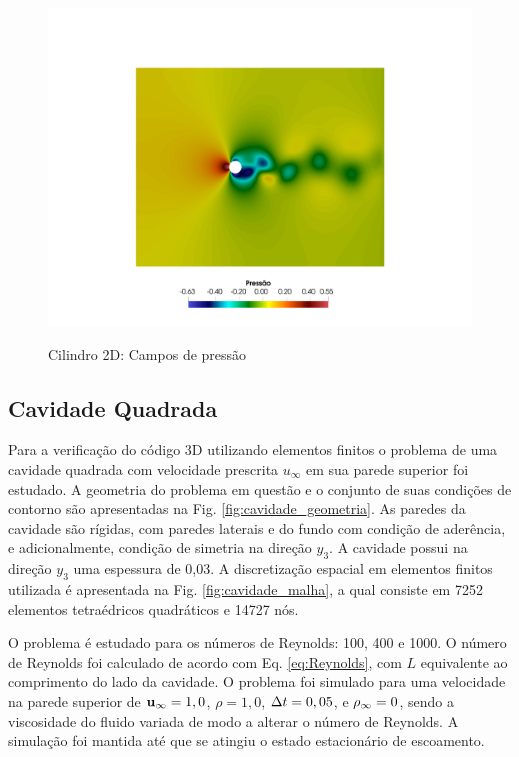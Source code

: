 \documentclass[tese_patricia]{subfiles}%
\begin{document}
\begin{figure}[htb!]
	{\includegraphics[trim=0cm 0cm 0cm 32cm,clip=true,scale=0.30]{Imagens/Cap2/press2080.pdf}} \\
	\caption{Cilindro 2D: Campos de pressão}
	\label{fig:cilindro_campos_pressao}
\end{figure}


\subsection{Cavidade Quadrada} \label{subsec:CavQua3d}

Para a verificação do código 3D utilizando elementos finitos o problema de uma cavidade quadrada com velocidade prescrita $u_{\infty}$ em sua parede superior foi estudado. A geometria do problema em questão e o conjunto de suas condições de contorno são apresentadas na Fig. \ref{fig:cavidade_geometria}. As paredes da cavidade são rígidas, com paredes laterais e do fundo com condição de aderência, e adicionalmente, condição de simetria na direção $y_3$. A cavidade possui na direção $y_3$ uma espessura de 0,03. A discretização espacial em elementos finitos utilizada é apresentada na Fig.  \ref{fig:cavidade_malha}, a qual consiste em 7252 elementos tetraédricos quadráticos e 14727 nós.

O problema é estudado para os números de Reynolds: 100, 400 e 1000. O número de Reynolds foi calculado de acordo com Eq. \eqref{eq:Reynolds}, com $L$ equivalente ao comprimento do lado da cavidade. O problema foi simulado para uma velocidade na parede superior de $\mathbf{u}_{\infty} = 1,0$, $\rho = 1,0$, $\Delta t = 0,05$, e $\rho_\infty = 0$, sendo a viscosidade do fluido variada de modo a alterar o número de Reynolds. A simulação foi mantida até que se atingiu o estado estacionário de escoamento. 
\end{document}
